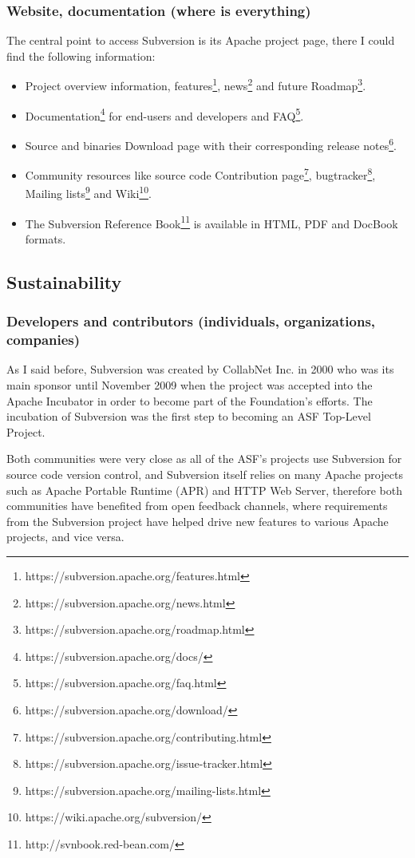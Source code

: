 \documentclass[a4paper,10pt]{article}
\begin{document}
\subsubsection{Website, documentation (where is everything)}

The central point to access Subversion is its Apache project
page\cite{Subversion}, there I could find the following information:

\begin{itemize}
\item Project overview information,
features\footnote{https://subversion.apache.org/features.html},
news\footnote{https://subversion.apache.org/news.html} and future
Roadmap\footnote{https://subversion.apache.org/roadmap.html}. 
\item Documentation\footnote{https://subversion.apache.org/docs/} for end-users
and developers and FAQ\footnote{https://subversion.apache.org/faq.html}.
\item Source and binaries Download page with their corresponding release
notes\footnote{https://subversion.apache.org/download/}.
\item Community resources like source code Contribution
page\footnote{https://subversion.apache.org/contributing.html},
bugtracker\footnote{https://subversion.apache.org/issue-tracker.html}, Mailing
lists\footnote{https://subversion.apache.org/mailing-lists.html} and
Wiki\footnote{https://wiki.apache.org/subversion/}.
\item The Subversion Reference Book\footnote{http://svnbook.red-bean.com/} is available in HTML, PDF and DocBook formats.
\end{itemize}

\subsection{Sustainability}
\subsubsection{Developers and contributors (individuals, organizations,
companies)}

As I said before, Subversion was created by CollabNet Inc. in 2000 who was its
main sponsor until November 2009 when the project was accepted into the Apache
Incubator in order to become part of the Foundation's efforts. The incubation of
Subversion was the first step to becoming an ASF Top-Level Project. 

Both communities were very close as all of the ASF's projects use Subversion for
source code version control, and Subversion itself relies on many Apache
projects such as Apache Portable Runtime (APR) and HTTP Web Server, therefore
both communities have benefited from open feedback channels, where requirements
from the Subversion project have helped drive new features to various Apache
projects, and vice versa\cite{Apache}.
\end{document}
